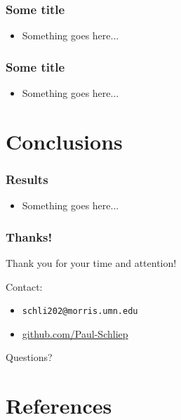 \documentclass{beamer}
\newcommand{\linespace}{\vskip 0.25cm}
\begin{document}
\begin{frame}
	\frametitle{Some title}
		\begin{itemize}
			\item Something goes here...
		\end{itemize}

\end{frame}

\begin{frame}
	\frametitle{Some title}
		\begin{itemize}
			\item Something goes here...
		\end{itemize}

\end{frame}


\section[Conclusions]{Conclusions}

\begin{frame}
	\frametitle{Results}
		\begin{itemize}
			\item Something goes here...
		\end{itemize}

\end{frame}

\begin{frame}
	\frametitle{Thanks!}
	
	Thank you for your time and attention!
		
	\linespace
	\linespace
	
	Contact:  
	\begin{itemize}
		\item \texttt{schli202@morris.umn.edu}
		\item \url{github.com/Paul-Schliep}
	\end{itemize}
	
	\linespace
	\linespace
	
	\begin{center}
	{\huge Questions?}
	\end{center}
\end{frame}

\section*{References}
\end{document}
